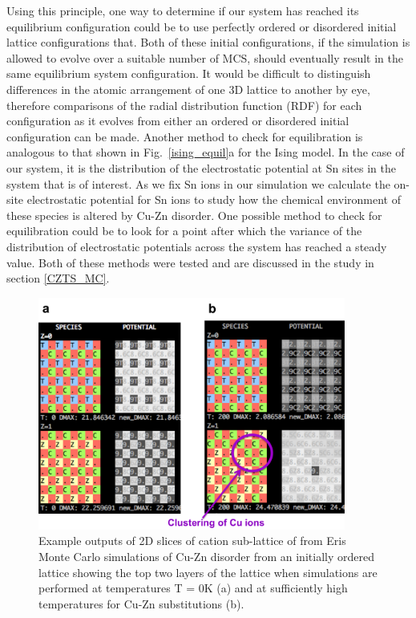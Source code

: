 \documentclass[11pt, twoside]{report}
\begin{document}
Using this principle, one way to determine if our system has reached its equilibrium configuration could be to use perfectly ordered or disordered initial lattice configurations that. Both of these initial configurations, if the simulation is allowed to evolve over a suitable number of MCS, should eventually result in the same equilibrium system configuration. It would be difficult to distinguish differences in the atomic arrangement of one 3D lattice to another by eye, therefore comparisons of the radial distribution function (RDF) for each configuration as it evolves from either an ordered or disordered initial configuration can be made. 
Another method to check for equilibration is analogous to that shown in Fig.~\ref{ising_equil}a for the Ising model. In the case of our system, it is the distribution of the electrostatic potential at Sn sites in the system that is of interest. As we fix Sn ions in our simulation we calculate the on-site electrostatic potential for Sn ions to study how the chemical environment of these species is altered by Cu-Zn disorder. One possible method to check for equilibration could be to look for a point after which the variance of the distribution of electrostatic potentials across the system has reached a steady value. Both of these methods were tested and are discussed in the study in section \ref{CZTS_MC}.

\begin{figure}[h!]
  \centering
    \includegraphics[width=0.9\textwidth]{figures/eris_spatial_disorder.png}
    \caption{Example outputs of 2D slices of cation sub-lattice of {\CZTS} from Eris Monte Carlo simulations of Cu-Zn disorder from an initially ordered lattice showing the top two layers of the lattice when simulations are performed at temperatures T = 0K (a) and at sufficiently high temperatures for Cu-Zn substitutions (b).}
  \label{eris_spatial_disorder}
\end{figure}
\end{document}
